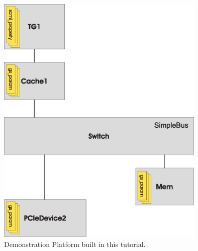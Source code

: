 \begin{figure}[htbp]
	\centerline{
		\includegraphics[width=10cm]{DemoPlatform.eps}} 
	\caption{Demonstration Platform built in this tutorial. }
	\label{fig:demoplatform}
\end{figure}

